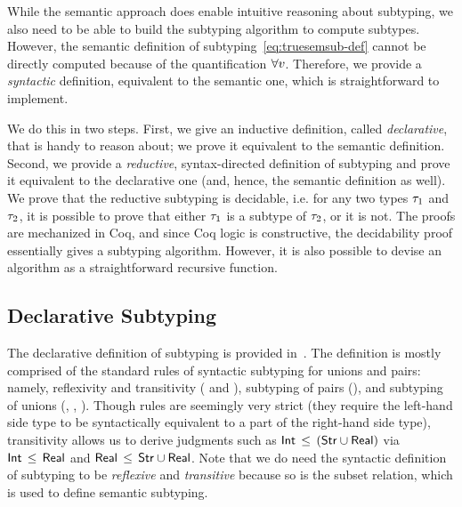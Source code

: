 While the semantic approach does enable intuitive %
reasoning about subtyping,
we also need to be able to build the subtyping algorithm 
to compute subtypes.
However, the semantic definition of subtyping~\eqref{eq:truesemsub-def}
cannot be directly computed because of the quantification $\forall v$.
Therefore, we provide a \emph{syntactic} definition, 
equivalent to the semantic one, which is straightforward to implement.

We do this in two steps. 
First, we give an inductive definition, called \emph{declarative}, 
that is handy to reason about; 
we prove it equivalent to the semantic definition.
Second, we provide a \emph{reductive}, syntax-directed definition of subtyping
and prove it equivalent to the declarative one 
(and, hence, the semantic definition as well).
We prove that the reductive subtyping is decidable, 
i.e. for any two types $\tau_1$ and $\tau_2$,
it is possible to prove that either $\tau_1$ is a subtype of $\tau_2$, 
or it is not.
The proofs are mechanized in Coq, and since Coq logic is constructive,
the decidability proof essentially gives a subtyping algorithm.
However, it is also possible to devise an algorithm
as a straightforward recursive function.

\subsection{Declarative Subtyping}\label{sec:declsub}

The declarative definition of subtyping is provided in~.
The definition is mostly comprised of the standard rules
of syntactic subtyping for unions and pairs:
namely, reflexivity and transitivity ( and ), 
subtyping of pairs (),
and subtyping of unions (, , ).
Though  rules are seemingly very strict 
(they require the left-hand side type to be syntactically equivalent
to a part of the right-hand side type), 
transitivity allows us to derive judgments such as
$\mathsf{Int} \, \leq \, (\mathsf{Str} \cup \mathsf{Real})$ via
$\mathsf{Int} \, \leq \, \mathsf{Real}$ and $\mathsf{Real} \, \leq \, \mathsf{Str} \cup \mathsf{Real}$.
Note that we do need the syntactic definition of subtyping
to be \emph{reflexive} and \emph{transitive} because so is the subset relation,
which is used to define semantic subtyping.

